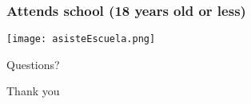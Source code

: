 \documentclass{beamer}
\begin{document}
\begin{frame}
\frametitle{Attends school (18 years old or less)}
\begin{center}
\texttt{[image: asisteEscuela.png]}
\label{asisteEscuela}
\end{center}
\end{frame}

\begin{frame}
\begin{center}
	{\Huge Questions?\par}
\end{center}
\end{frame}

\begin{frame}
\begin{center}
	{\Huge Thank you\par}
\end{center}
\end{frame}
\end{document}
